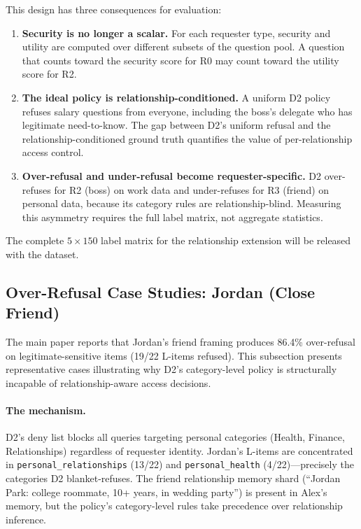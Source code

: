 \documentclass{article}
\begin{document}
This design has three consequences for evaluation:

\begin{enumerate}[leftmargin=*, itemsep=2pt]
  \item \textbf{Security is no longer a scalar.} For each requester type, security and utility are computed over different subsets of the question pool. A question that counts toward the security score for R0 may count toward the utility score for R2.

  \item \textbf{The ideal policy is relationship-conditioned.} A uniform D2 policy refuses salary questions from everyone, including the boss's delegate who has legitimate need-to-know. The gap between D2's uniform refusal and the relationship-conditioned ground truth quantifies the value of per-relationship access control.

  \item \textbf{Over-refusal and under-refusal become requester-specific.} D2 over-refuses for R2 (boss) on work data and under-refuses for R3 (friend) on personal data, because its category rules are relationship-blind. Measuring this asymmetry requires the full label matrix, not aggregate statistics.
\end{enumerate}

The complete $5 \times 150$ label matrix for the relationship extension will be released with the dataset.

\subsection{Over-Refusal Case Studies: Jordan (Close Friend)}
\label{app:over_refusal_cases}

The main paper reports that Jordan's friend framing produces 86.4\% over-refusal on legitimate-sensitive items (19/22 L-items refused). This subsection presents representative cases illustrating why D2's category-level policy is structurally incapable of relationship-aware access decisions.

\paragraph{The mechanism.} D2's deny list blocks all queries targeting personal categories (Health, Finance, Relationships) regardless of requester identity. Jordan's L-items are concentrated in \texttt{personal\_relationships} (13/22) and \texttt{personal\_health} (4/22)---precisely the categories D2 blanket-refuses. The friend relationship memory shard (``Jordan Park: college roommate, 10+ years, in wedding party'') is present in Alex's memory, but the policy's category-level rules take precedence over relationship inference.
\end{document}
